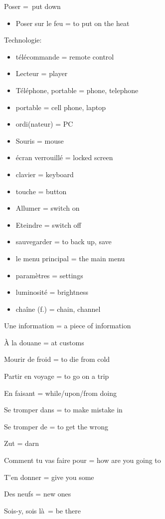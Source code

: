 {Poser =~put down}

\begin{itemize}
\item
  {Poser sur le feu = to put on the heat~}
\end{itemize}

{Technologie:}

\begin{itemize}
\item
  {télécommande = remote control}
\item
  {Lecteur = player}
\item
  {Téléphone, portable = phone, telephone}
\item
  {portable = cell phone, laptop}
\item
  {ordi(nateur) = PC}
\item
  {Souris = mouse}
\item
  {écran verrouillé = locked screen}
\item
  {clavier = keyboard}
\item
  {touche = button}
\item
  {Allumer = switch on}
\item
  {Eteindre = switch off}
\item
  {sauvegarder = to back up, save}
\item
  {le menu principal = the main menu}
\item
  {paramètres = settings}
\item
  {luminosité = brightness}
\item
  {chaîne (f.) = chain, channel}
\end{itemize}

{Une information = a piece of information~}

{À la douane = at customs~}

{Mourir de froid = to die from cold~}

{Partir en voyage = to go on a trip~}

{En faisant = while/upon/from doing}

{Se tromper dans = to make mistake in~}

{Se tromper de = to get the wrong}

{Zut = darn}

{Comment tu vas faire pour = how are you going to~}

{T'en donner = give you some~}

{Des neufs = new ones~}

{Sois-y, sois là~= be there~}

